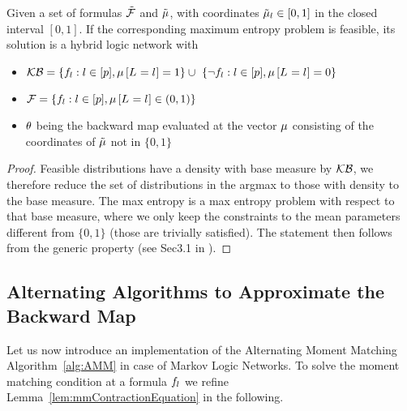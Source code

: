 \begin{theorem}
	Given a set of formulas $\tilde{\mathcal{F}}$ and $\tilde{\mu}$, with coordinates $\tilde{\mu}_l\in[0,1]$ in the closed interval $[0,1]$.
	If the corresponding maximum entropy problem is feasible, its solution is a hybrid logic network with 
	\begin{itemize}
		\item $\hardformulaset= \{\enumformula : \selindexin, \meanparamat{\indexedselvariable} = 1\} \cup  \{\lnot\enumformula : \selindexin, \meanparamat{\indexedselvariable} = 0\} $
		\item $\mathcal{F} = \{f_{l} : l\in[p], \mu\left[L_{}=l_{}\right] \in (0,1)\}$
		\item $\theta$ being the backward map evaluated at the vector $\mu$ consisting of the coordinates of $\tilde{\mu}$ not in $\{0,1\}$
	\end{itemize}
\end{theorem}
\begin{proof}
	Feasible distributions have a density with base measure by $\mathcal{KB}$, we therefore reduce the set of distributions in the argmax to those with density to the base measure.
	The max entropy is a max entropy problem with respect to that base measure, where we only keep the constraints to the mean parameters different from $\{0,1\}$ (those are trivially satisfied).
	The statement then follows from the generic property (see Sec3.1 in \cite{wainwright_graphical_2008}).
\end{proof}






\subsection{Alternating Algorithms to Approximate the Backward Map}\label{sec:alternatingParEstMLN}

Let us now introduce an implementation of the Alternating Moment Matching Algorithm~\ref{alg:AMM} in case of Markov Logic Networks.
To solve the moment matching condition at a formula $f_{l}$ we refine Lemma~\ref{lem:mmContractionEquation} in the following.

